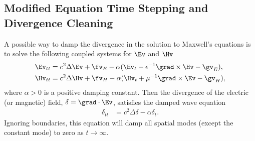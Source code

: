 \clearpage
\subsection{Modified Equation Time Stepping and Divergence Cleaning}\label{sec:modifiedDivergenceCleaning}


A possible way to damp the divergence in the solution to Maxwell's equations is to solve the following
coupled systems for $\Ev$ and $\Hv$
\begin{align}
   \Ev_{tt} & = c^2 \Delta \Ev + \fv_E -\alpha( \Ev_t - \eps^{-1} \grad\times \Hv -\gv_E ), \label{eq:Edamped}\\
   \Hv_{tt} & = c^2 \Delta \Hv + \fv_H -\alpha( \Hv_t + \mu^{-1} \grad\times \Ev  -\gv_H ) , \label{eq:Hdamped}
\end{align}
where $\alpha>0$ is a positive damping constant.
Then the divergence of the electric (or magnetic) field, $\delta = \grad\cdot\Ev$, satisfies the damped wave equation
\begin{align*}
   \delta_{tt} & = c^2 \Delta \delta - \alpha \delta_t. 
\end{align*}
Ignoring boundaries, this equation will damp all spatial modes (except the constant mode) to zero as $t\rightarrow \infty$.


